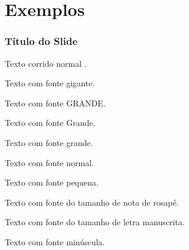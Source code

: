 \section{Exemplos}


\begin{frame}

    \frametitle{Título do Slide}

    Texto corrido normal .
    
    \begin{huge}
        Texto com fonte gigante.
    \end{huge}
    
    \begin{LARGE}
        Texto com fonte GRANDE.
    \end{LARGE}
        
    \begin{Large}
        Texto com fonte Grande.
    \end{Large}
    
    \begin{large}
        Texto com fonte grande.
    \end{large}
    
    \begin{normalsize}
        Texto com fonte normal.
    \end{normalsize}
        
    \begin{small}
        Texto com fonte pequena.
    \end{small}
        
    \begin{footnotesize}
        Texto com fonte do tamanho de nota de rosapé.
    \end{footnotesize}
    
    \begin{scriptsize}
        Texto com fonte do tamanho de letra manuscrita.
    \end{scriptsize}
        
    \begin{tiny}
        Texto com fonte minúscula.
    \end{tiny}        

\end{frame}


